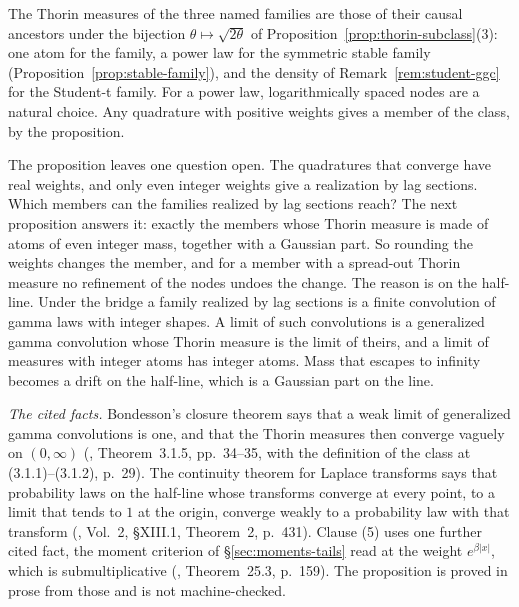 The Thorin measures of the three named families are those of their causal ancestors under the
bijection $\theta \mapsto \sqrt{2\theta}$ of Proposition~\ref{prop:thorin-subclass}(3): one
atom for the \Matern{} family, a power law for the symmetric stable family
(Proposition~\ref{prop:stable-family}), and the density of Remark~\ref{rem:student-ggc} for
the Student-t family. For a power law, logarithmically spaced nodes are a natural choice. Any
quadrature with positive weights gives a member of the class, by the proposition.

The proposition leaves one question open. The quadratures that converge have real weights,
and only even integer weights give a realization by lag sections. Which members can the
families realized by lag sections reach? The next proposition answers it: exactly the members whose Thorin
measure is made of atoms of even integer mass, together with a Gaussian part. So rounding the
weights changes the member, and for a member with a spread-out Thorin measure no refinement
of the nodes undoes the change. The reason is on the half-line. Under the bridge a family
realized by lag sections is a finite convolution of gamma laws with integer shapes. A limit of
such convolutions is a generalized gamma convolution whose Thorin measure is the limit of
theirs, and a limit of measures with integer atoms has integer atoms. Mass that escapes to
infinity becomes a drift on the half-line, which is a Gaussian part on the line.

\emph{The cited facts.} Bondesson's closure theorem says that a weak limit of generalized
gamma convolutions is one, and that the Thorin measures then converge vaguely on $(0,\infty)$
(, Theorem~3.1.5, pp.~34--35, with the definition of the
class at (3.1.1)--(3.1.2), p.~29). The continuity theorem for Laplace transforms says that
probability laws on the half-line whose transforms converge at every point, to a limit that
tends to $1$ at the origin, converge weakly to a probability law with that transform
(, Vol.~2, \S XIII.1, Theorem~2, p.~431). Clause (5) uses one
further cited fact, the moment criterion of \S\ref{sec:moments-tails} read at the weight
$e^{\beta|x|}$, which is submultiplicative (, Theorem~25.3, p.~159). The
proposition is proved in prose from those and is not machine-checked.

